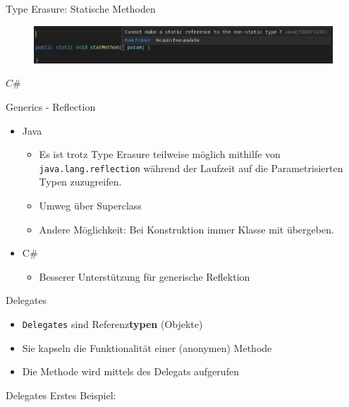 \documentclass[11pt]{beamer}
\begin{document}
\begin{frame}{Type Erasure: Statische Methoden}
	\begin{figure}
		\includegraphics[width=\textwidth]{bilder/java_no_static_methods.png}
	\end{figure}
	
	$C\#$
\end{frame}

\begin{frame}{Generics - Reflection}
\begin{itemize}
	\item Java 
	\begin{itemize}
		\item Es ist trotz Type Erasure teilweise möglich mithilfe von \texttt{java.lang.reflection} während der Laufzeit auf die Parametrisierten Typen zuzugreifen. 
		\item \glqq Umweg\grqq{} über Superclass
		\item Andere Möglichkeit: Bei Konstruktion immer Klasse mit übergeben.
	\end{itemize}
	\item C\# 
	\begin{itemize}
		\item Besserer Unterstützung für generische Reflektion
	\end{itemize}
\end{itemize}
\end{frame}


\begin{frame}{Delegates}
\begin{itemize}
 	\item \texttt{Delegates} sind Referenz\textbf{typen} (Objekte)
 	\item Sie kapseln die Funktionalität einer (anonymen) Methode
 	\item Die Methode wird mittels des Delegats aufgerufen
\end{itemize}
	
\end{frame}
\begin{frame}{Delegates}
	Erstes Beispiel:
\end{frame}
\end{document}
